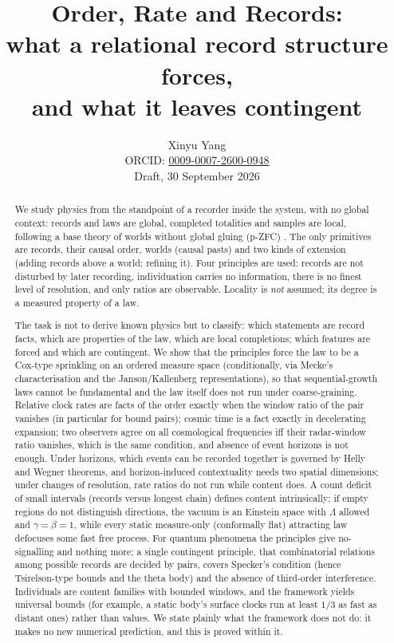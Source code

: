 \documentclass[11pt]{article}
\title{Order, Rate and Records:\\[2pt]
\large what a relational record structure forces,\\ and what it leaves contingent}
\author{Xinyu Yang\\[2pt]
\small ORCID: \href{https://orcid.org/0009-0007-2600-0948}{0009-0007-2600-0948}\\[2pt]
\small Draft, 30 September 2026}
\date{}
\theoremstyle{definition}
\theoremstyle{remark}
\begin{document}
\maketitle

\begin{abstract}
We study physics from the standpoint of a recorder inside the system, with no global context: records and laws are global, completed totalities and samples are local, following a base theory of worlds without global gluing (p-ZFC) \cite{pzfc}. The only primitives are records, their causal order, worlds (causal pasts) and two kinds of extension (adding records above a world; refining it). Four principles are used: records are not disturbed by later recording, individuation carries no information, there is no finest level of resolution, and only ratios are observable. Locality is \emph{not} assumed; its degree is a measured property of a law.

The task is not to derive known physics but to classify: which statements are record facts, which are properties of the law, which are local completions; which features are forced and which are contingent. We show that the principles force the law to be a Cox-type sprinkling on an ordered measure space (conditionally, via Mecke's characterisation and the Janson/Kallenberg representations), so that sequential-growth laws cannot be fundamental and the law itself does not run under coarse-graining. Relative clock rates are facts of the order exactly when the window ratio of the pair vanishes (in particular for bound pairs); cosmic time is a fact exactly in decelerating expansion; two observers agree on all cosmological frequencies iff their radar-window ratio vanishes, which is the same condition, and absence of event horizons is not enough. Under horizons, which events can be recorded together is governed by Helly and Wegner theorems, and horizon-induced contextuality needs two spatial dimensions; under changes of resolution, rate ratios do not run while content does. A count deficit of small intervals (records versus longest chain) defines content intrinsically; if empty regions do not distinguish directions, the vacuum is an Einstein space with $\Lambda$ allowed and $\gamma=\beta=1$, while every static measure-only (conformally flat) attracting law defocuses some fast free process. For quantum phenomena the principles give no-signalling and nothing more; a single contingent principle, that combinatorial relations among possible records are decided by pairs, covers Specker's condition (hence Tsirelson-type bounds and the theta body) and the absence of third-order interference. Individuals are content families with bounded windows, and the framework yields universal bounds (for example, a static body's surface clocks run at least $1/3$ as fast as distant ones) rather than values. We state plainly what the framework does not do: it makes no new numerical prediction, and this is proved within it.
\end{abstract}
\end{document}
